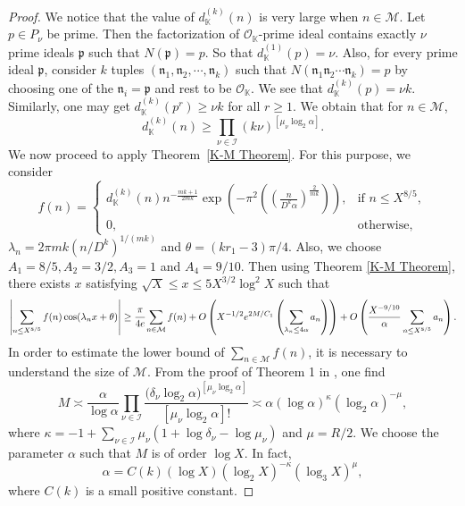 \documentclass[reqno]{amsart}
\numberwithin{equation}{section}
\theoremstyle{plain}
\begin{document}
\begin{proof}
We notice that the value of $d_{\mathbb{K}}^{(k)}(n)$ is very large when $n\in \mathcal{M}$. Let $p\in P_{\nu}$ be  prime. Then the factorization of $\mathcal{O}_{\mathbb{K}}$-prime ideal contains exactly $\nu$ prime ideals $\mathfrak{p}$ such that $N(\mathfrak{p})=p$. So that $d_{\mathbb{K}}^{(1)}(p) = \nu$. Also, for every prime ideal $\mathfrak{p}$, consider $k$ tuples $(\mathfrak{n}_1, \mathfrak{n}_2, \cdots, \mathfrak{n}_k)$ such that $N(\mathfrak{n}_1 \mathfrak{n}_2 \cdots \mathfrak{n}_k)=p$ by choosing one of the $\mathfrak{n}_i=\mathfrak{p}$ and rest to be $\mathcal{O}_{\mathbb{K}}$. We see that $d_{\mathbb{K}}^{(k)}(p)=\nu k$. Similarly, one may get $d_{\mathbb{K}}^{(k)}(p^r)\geq\nu k$ for all                                                                                                                                                                       $r\geq 1$. We obtain that for $n\in \mathcal{M}$,
\begin{equation} \label{lower bound of d_K}
	d_{\mathbb{K}}^{(k)}(n) \geq \prod_{\nu \in \mathcal{I}} (k\nu)^{[\mu_{\nu} \log_2 \alpha]}.
\end{equation}
We now proceed to apply Theorem~\ref{K-M Theorem}. For this purpose, we consider
\begin{equation*}
	f(n) = 
	\begin{cases}
		\displaystyle d_{\mathbb{K}}^{(k)}(n)n^{-\frac{mk+1}{2mk}} \exp\left( -\pi^2 \left(\left(\frac{n}{D^k\alpha}\right)^{\frac{2}{mk}}\right)\right), & \text{if } n \leq X^{8/5}, \\[1ex]
		0, & \text{otherwise},
	\end{cases}
\end{equation*}
$\lambda_n = 2\pi mk  (n/D^k)^{1/(mk)}$ and $\theta= (kr_1-3)\pi/4$. Also, we choose $A_1=8/5, A_2=3/2, A_3=1$ and $A_4=9/10$. Then using Theorem \ref{K-M Theorem}, there exists $x$ satisfying  $\sqrt{X}\leq x\leq 5X^{3/2}\log^2 X$ such that 
\begin{equation} \label{Lower bound of A(x)}
 \left|\sum_{n\leq X^{8/5}}f(n)\cos(\lambda_nx +\theta)\right|	 \geq \cfrac{\pi}{4e} \sum_{n\in \mathcal{M}}f(n) + O\left( X^{-1/2}e^{2M/C_1}\left(\sum_{\lambda_n\leq 4\alpha}a_n\right)\right) +  O\left(\frac{X^{-9/10}}{\alpha}\sum_{n\leq X^{8/5}}a_n\right).
\end{equation}
In order to estimate the lower bound of $\sum_{n\in \mathcal{M}} f(n)$, it is necessary to understand the size of $\mathcal{M}$. From the proof of Theorem 1 in \cite{GKMN}, one find
\begin{equation*}
	M\asymp \frac{\alpha}{\log \alpha} \prod_{\nu \in \mathcal{I}}\frac{\Big( \delta_{\nu} \log_2 \alpha\Big)^{[\mu_{\nu} \log_2 \alpha]}}{[\mu_{\nu} \log_2 \alpha]!} \asymp \alpha (\log \alpha)^{\kappa} (\log_2 \alpha)^{-\mu},
\end{equation*}
where $\kappa = -1 +\sum_{\nu \in \mathcal{I}} \mu_{\nu}(1+\log\delta_{\nu}-\log \mu_{\nu})$ and $\mu = R/2$. 
 We choose  the parameter $\alpha$ such that $M$ is of order $\log X$.
In fact,
\begin{equation*}
	\alpha = C(k) (\log X) (\log_2 X)^{-\kappa} (\log_3 X)^{\mu},
\end{equation*}
where $C(k)$ is a small positive constant. 


\end{proof}
\end{document}
